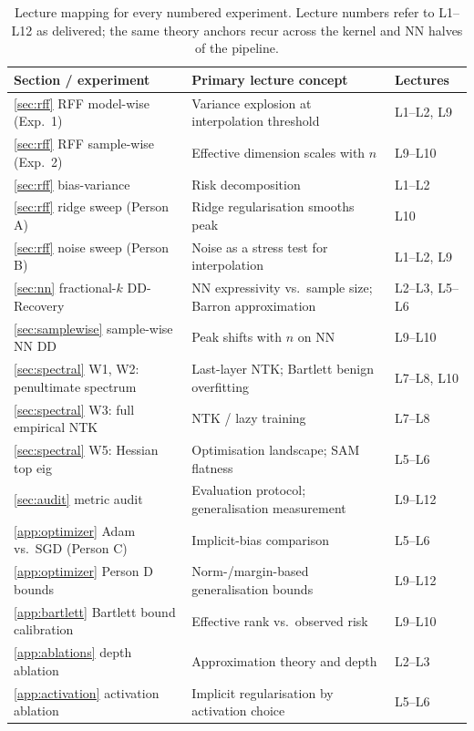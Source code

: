 \begin{table}[t]
  \centering
  \small
  \caption{Lecture mapping for every numbered experiment. Lecture numbers refer to L1--L12 as delivered; the same theory anchors recur across the kernel and NN halves of the pipeline.}
  \label{tab:lectures}
  \begin{tabular}{@{}lll@{}}
    \toprule
    Section / experiment & Primary lecture concept & Lectures \\
    \midrule
    \cref{sec:rff} RFF model-wise (Exp.~1) & Variance explosion at interpolation threshold & L1--L2, L9 \\
    \cref{sec:rff} RFF sample-wise (Exp.~2) & Effective dimension scales with $n$ & L9--L10 \\
    \cref{sec:rff} bias-variance & Risk decomposition & L1--L2 \\
    \cref{sec:rff} ridge sweep (Person A) & Ridge regularisation smooths peak & L10 \\
    \cref{sec:rff} noise sweep (Person B) & Noise as a stress test for interpolation & L1--L2, L9 \\
    \cref{sec:nn} fractional-$k$ DD-Recovery & NN expressivity vs.\ sample size; Barron approximation & L2--L3, L5--L6 \\
    \cref{sec:samplewise} sample-wise NN DD & Peak shifts with $n$ on NN & L9--L10 \\
    \cref{sec:spectral} W1, W2: penultimate spectrum & Last-layer NTK; Bartlett benign overfitting & L7--L8, L10 \\
    \cref{sec:spectral} W3: full empirical NTK & NTK / lazy training & L7--L8 \\
    \cref{sec:spectral} W5: Hessian top eig & Optimisation landscape; SAM flatness & L5--L6 \\
    \cref{sec:audit} metric audit & Evaluation protocol; generalisation measurement & L9--L12 \\
    \cref{app:optimizer} Adam vs.\ SGD (Person C) & Implicit-bias comparison & L5--L6 \\
    \cref{app:optimizer} Person D bounds & Norm-/margin-based generalisation bounds & L9--L12 \\
    \cref{app:bartlett} Bartlett bound calibration & Effective rank vs.\ observed risk & L9--L10 \\
    \cref{app:ablations} depth ablation & Approximation theory and depth & L2--L3 \\
    \cref{app:activation} activation ablation & Implicit regularisation by activation choice & L5--L6 \\
    \bottomrule
  \end{tabular}
\end{table}

